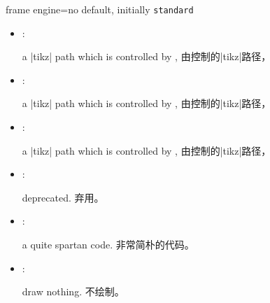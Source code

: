 \begin{docTcbKey}{frame engine}{=}{no default, initially \texttt{standard}}
\begin{itemize}
  \item{}: 
\begin{stripedbox}
a |tikz| path which is controlled by ,
\tcblower
由控制的|tikz|路径，
\end{stripedbox}

  \item{}: 
\begin{stripedbox}
a |tikz| path which is controlled by ,
\tcblower
由控制的|tikz|路径，
\end{stripedbox}
  \item{}: 
\begin{stripedbox}
a |tikz| path which is controlled by ,
\tcblower
由控制的|tikz|路径，
\end{stripedbox}
  \item{}: 
\begin{stripedbox}
deprecated.
\tcblower
弃用。
\end{stripedbox}
  \item{}: 
\begin{stripedbox}
a quite spartan code.
\tcblower
非常简朴的代码。
\end{stripedbox}
  \item{}: 
\begin{stripedbox}
draw nothing.
\tcblower
不绘制。
\end{stripedbox}
\end{itemize}
\end{docTcbKey}

